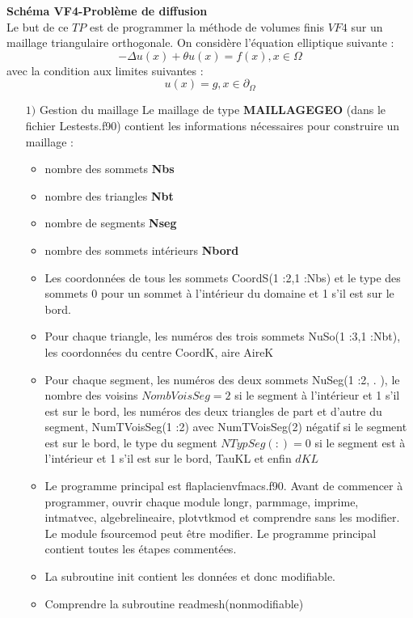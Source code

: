 \documentclass[11pt,a4paper]{scrartcl}%
\theoremstyle{plain}
\theoremstyle{definition}
\theoremstyle{remark}
\begin{document}
\textbf{Schéma VF4-Problème de diffusion}\\
Le but de ce $TP$ est de programmer la méthode de 		volumes finis $VF4$ sur un maillage triangulaire orthogonale. On considère l'équation elliptique suivante :
\begin{equation}
-\Delta u(x) +\theta u(x) = f(x), x \in \Omega
\end{equation}
avec la condition aux limites suivantes : 
\begin{equation}
u(x) = g, x \in \partial_{\Omega}
\end{equation}
\begin{itemize}
\item[$1)$] Gestion du maillage
Le maillage de type \textbf{MAILLAGEGEO} (dans le fichier Lestests.f90) contient les informations nécessaires pour construire un maillage :
	\begin{itemize}
	\item nombre des sommets \textbf{Nbs}
	\item nombre des triangles \textbf{Nbt}
	\item nombre de segments \textbf{Nseg}
	\item nombre des sommets intérieurs \textbf{Nbord}
	\item Les coordonnées de tous les sommets CoordS(1 :2,1 :Nbs) et le type des sommets $0$ pour un sommet à l’intérieur du domaine et 1 s’il est sur le bord.
	\item Pour chaque triangle, les numéros des trois sommets NuSo(1 :3,1 :Nbt), les coordonnées
du centre CoordK, aire AireK
	\item Pour chaque segment, les numéros des deux sommets NuSeg(1 :2, . ), le nombre des voisins $NombVoisSeg =2$ si le segment à l’intérieur et 1 s’il est sur le bord, les numéros des deux triangles de part et d’autre du segment, NumTVoisSeg(1 :2) avec NumTVoisSeg(2) négatif si le segment est sur le bord, le type du segment $NTypSeg( :) =0$ si le segment est à l’intérieur et 1 s’il est sur le bord, TauKL et enfin $dKL$
	\item Le programme principal est flaplacienvfmacs.f90. Avant de commencer à programmer, ouvrir chaque module longr, parmmage, imprime, intmatvec, algebrelineaire, plotvtkmod et comprendre sans les modifier. Le module fsourcemod peut être modifier.
Le programme principal contient toutes les étapes commentées.
	\item La subroutine init contient les données et donc modifiable.
	\item Comprendre la subroutine readmesh(nonmodifiable)

\end{itemize}
\end{itemize}
\end{document}
